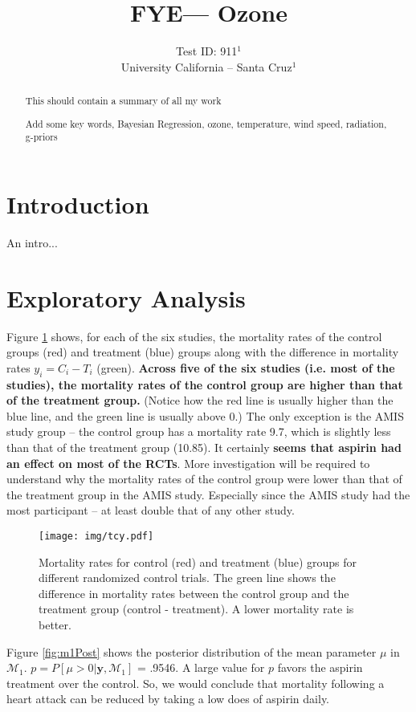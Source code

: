 \documentclass{../../tex_template/asaproc}
\title{FYE--- Ozone}
\author{
  Test ID: 911$^1$\\
  University California -- Santa Cruz$^1$\\
}
\newcommand{\bk}[1]{\left[#1\right]}
\newcommand{\M}{\mathcal{M}}
\begin{document}
\maketitle
\begin{abstract}
This should contain a summary of all my work

\begin{keywords}
Add some key words,
Bayesian Regression, ozone, temperature, wind speed, radiation, g-priors
\end{keywords}
\end{abstract}

\section{Introduction}
An intro...

\section{Exploratory Analysis}
Figure \ref{fig:tcy} shows, for each of the six studies, the mortality rates of
the control groups (red) and treatment (blue) groups along with the difference
in mortality rates $y_i = C_i-T_i$ (green). \textbf{Across five of the six studies
(i.e. most of the studies), the mortality rates of the control group are higher
than that of the treatment group.} (Notice how the red line is usually higher
than the blue line, and the green line is usually above 0.) The only exception
is the AMIS study group -- the control group has a mortality rate 9.7, which is
slightly less than that of the treatment group (10.85). It certainly \textbf{seems
that aspirin had an effect on most of the RCTs}. More investigation will be
required to understand why the mortality rates of the control group were lower
than that of the treatment group in the AMIS study. Especially since the AMIS
study had the most participant -- at least double that of any other study.

\begin{figure}[H]
  \texttt{[image: img/tcy.pdf]}
  \caption{\small Mortality rates for control (red) and treatment (blue) groups
  for different randomized control trials. The green line shows the difference
  in mortality rates between the control group and the treatment group (control -
  treatment). A lower mortality rate is better.}
  \label{fig:tcy}
\end{figure}

Figure \ref{fig:m1Post} shows the posterior distribution of the mean parameter
$\mu$ in $\M_1$. $p=P\bk{\mu>0|\bm{y},\M_1}$ = .9546. A large
value for $p$ favors the aspirin treatment over the control. So, we would
conclude that mortality following a heart attack can be reduced by taking a low
does of aspirin daily.
\end{document}
